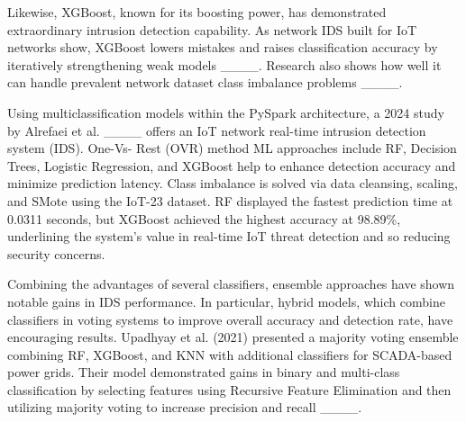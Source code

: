 Likewise, XGBoost, known for its boosting power, has demonstrated extraordinary intrusion detection capability. As network IDS built for IoT networks show, XGBoost lowers mistakes and raises classification accuracy by iteratively strengthening weak models ____. Research also shows how well it can handle prevalent network dataset class imbalance problems ____.



Using multiclassification models within the PySpark architecture, a 2024 study by Alrefaei et al. ____ offers an IoT network real-time intrusion detection system (IDS). One-Vs- Rest (OVR) method ML approaches include RF, Decision Trees, Logistic Regression, and XGBoost help to enhance detection accuracy and minimize prediction latency. Class imbalance is solved via data cleansing, scaling, and SMote using the IoT-23 dataset. RF displayed the fastest prediction time at 0.0311 seconds, but XGBoost achieved the highest accuracy at 98.89\%, underlining the system's value in real-time IoT threat detection and so reducing security concerns.

Combining the advantages of several classifiers, ensemble approaches have shown notable gains in IDS performance. In particular, hybrid models, which combine classifiers in voting systems to improve overall accuracy and detection rate, have encouraging results. Upadhyay et al. (2021) presented a majority voting ensemble combining RF, XGBoost, and KNN with additional classifiers for SCADA-based power grids. Their model demonstrated gains in binary and multi-class classification by selecting features using Recursive Feature Elimination and then utilizing majority voting to increase precision and recall ____.

